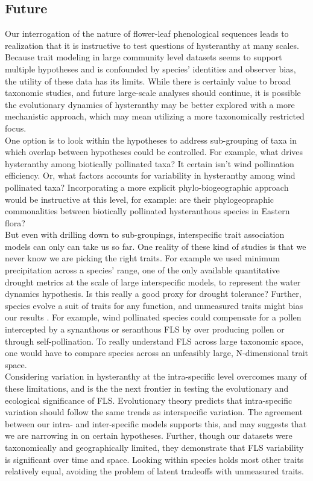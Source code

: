 \documentclass[12pt]{article}\usepackage[]{graphicx}\usepackage[]{color}
\begin{document}
\subsection*{Future}
 \indent\indent Our interrogation of the nature of flower-leaf phenological sequences leads to realization that it is instructive to test questions of hysteranthy at many scales. Because trait modeling in large community level datasets seems to support multiple hypotheses and is confounded by species' identities and observer bias, the utility of these data has its limits. While there is certainly value to broad taxonomic studies, and future large-scale analyses should continue, it is possible the evolutionary dynamics of hysteranthy may be better explored with a more mechanistic approach, which may mean utilizing a more taxonomically restricted focus.\\
\indent One option is to look within the hypotheses to address sub-grouping of taxa in which overlap between hypotheses could be controlled. For example, what drives hysteranthy among biotically pollinated taxa? It certain isn't wind pollination efficiency. Or, what factors accounts for variability in hysteranthy among wind pollinated taxa? Incorporating a more explicit phylo-biogeographic approach would be instructive at this level, for example: are their phylogeopraphic commonalities between biotically pollinated hysteranthous species in Eastern flora?\\
\indent But even with drilling down to sub-groupings, interspecific trait association models can only can take us so far. One reality of these kind of studies is that we never know we are picking the right traits. For example we used minimum precipitation across a species' range, one of the only available quantitative drought metrics at the scale of large interspecific models, to represent the water dynamics hypothesis. Is this really a good proxy for drought tolerance? Further, species evolve a suit of traits for any function, and unmeasured traits might bias our results \citep{Davies2019}. For example, wind pollinated species could compensate for a pollen intercepted by a synanthous or seranthous FLS by over producing pollen or through self-pollination. To really understand FLS across large taxonomic space, one would have to compare species across an unfeasibly large, N-dimensional trait space.\\
\indent Considering variation in hysteranthy at the intra-specific level overcomes many of these limitations, and is the the next frontier in testing the evolutionary and ecological significance of FLS. Evolutionary theory predicts that intra-specific variation should follow the same trends as interspecific variation. The agreement between our intra- and inter-specific models supports this, and may suggests that we are narrowing in on certain hypotheses. Further, though our datasets were taxonomically and geographically limited, they demonstrate that FLS variability is significant over time and space. Looking within species holds most other traits relatively equal, avoiding the problem of latent tradeoffs with unmeasured traits.\\
\end{document}
